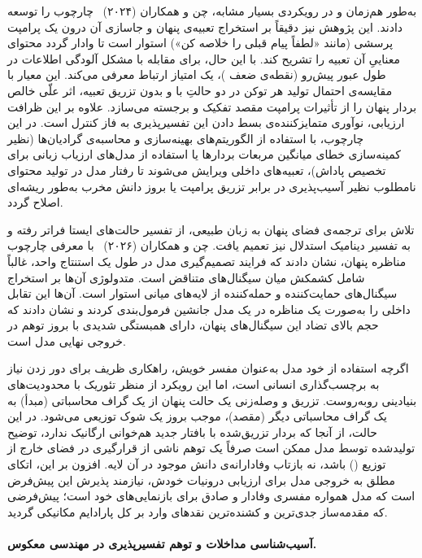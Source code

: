 به‌طور هم‌زمان و در رویکردی بسیار مشابه، چن و همکاران (۲۰۲۴)~\cite{chen2024selfie} چارچوب  را توسعه دادند. این پژوهش نیز دقیقاً بر استخراج تعبیه‌ی پنهان و جاسازی آن درون یک پرامپت پرسشی (مانند «لطفاً پیام قبلی را خلاصه کن») استوار است تا  وادار گردد محتوای معناییِ آن تعبیه را تشریح کند. با این حال،  برای مقابله با مشکل آلودگی اطلاعات در طول عبور پیش‌رو (نقطه‌ی ضعف )، یک امتیاز ارتباط معرفی می‌کند. این معیار با مقایسه‌ی احتمال تولید هر توکن در دو حالتِ با و بدون تزریق تعبیه، اثر علّی خالص بردار پنهان را از تأثیرات پرامپت مقصد تفکیک و برجسته می‌سازد. علاوه بر این ظرافت ارزیابی، نوآوری متمایزکننده‌ی  بسط دادن این تفسیرپذیری به فاز کنترل است. در این چارچوب، با استفاده از الگوریتم‌های بهینه‌سازی و محاسبه‌ی گرادیان‌ها (نظیر کمینه‌سازی خطای میانگین مربعات بردارها یا استفاده از مدل‌های ارزیاب زبانی برای تخصیص پاداش)، تعبیه‌های داخلی ویرایش می‌شوند تا رفتار مدل در تولید محتوای نامطلوب نظیر آسیب‌پذیری در برابر تزریق پرامپت یا بروز دانش مخرب به‌طور ریشه‌ای اصلاح گردد.

تلاش برای ترجمه‌ی فضای پنهان به زبان طبیعی، از تفسیر حالت‌های ایستا فراتر رفته و به تفسیر دینامیک استدلال نیز تعمیم یافت. چن و همکاران (۲۰۲۶)~\cite{chen2026latentdebate} با معرفی چارچوب مناظره پنهان، نشان دادند که فرایند تصمیم‌گیری مدل در طول یک استنتاج واحد، غالباً شامل کشمکش میان سیگنال‌های متناقض است. متدولوژی آن‌ها بر استخراج سیگنال‌های حمایت‌کننده و حمله‌کننده از لایه‌های میانی استوار است. آن‌ها این تقابل داخلی را به‌صورت یک مناظره در یک مدل جانشین فرمول‌بندی کردند و نشان دادند که حجم بالای تضاد این سیگنال‌های پنهان، دارای همبستگی شدیدی با بروز توهم در خروجی نهایی مدل است.

اگرچه استفاده از خود مدل به‌عنوان مفسر خویش، راهکاری ظریف برای دور زدن نیاز به برچسب‌گذاری انسانی است، اما این رویکرد از منظر تئوریک با محدودیت‌های بنیادینی روبه‌روست. تزریق و وصله‌زنی یک حالت پنهان از یک گراف محاسباتی (مبدأ) به یک گراف محاسباتی دیگر (مقصد)، موجب بروز یک شوک توزیعی می‌شود. در این حالت، از آنجا که بردار تزریق‌شده با بافتار جدید هم‌خوانی ارگانیک ندارد، توضیح تولیدشده توسط مدل ممکن است صرفاً یک توهم ناشی از قرارگیری در فضای خارج از توزیع () باشد، نه بازتاب وفادارانه‌ی دانش موجود در آن لایه. افزون بر این، اتکای مطلق به خروجی مدل برای ارزیابی درونیات خودش، نیازمند پذیرش این پیش‌فرض است که مدل همواره مفسری وفادار و صادق برای بازنمایی‌های خود است؛ پیش‌فرضی که مقدمه‌ساز جدی‌ترین و کشنده‌ترین نقدهای وارد بر کل پارادایم مکانیکی گردید.

\paragraph{آسیب‌شناسی مداخلات و توهم تفسیرپذیری در مهندسی معکوس.}

